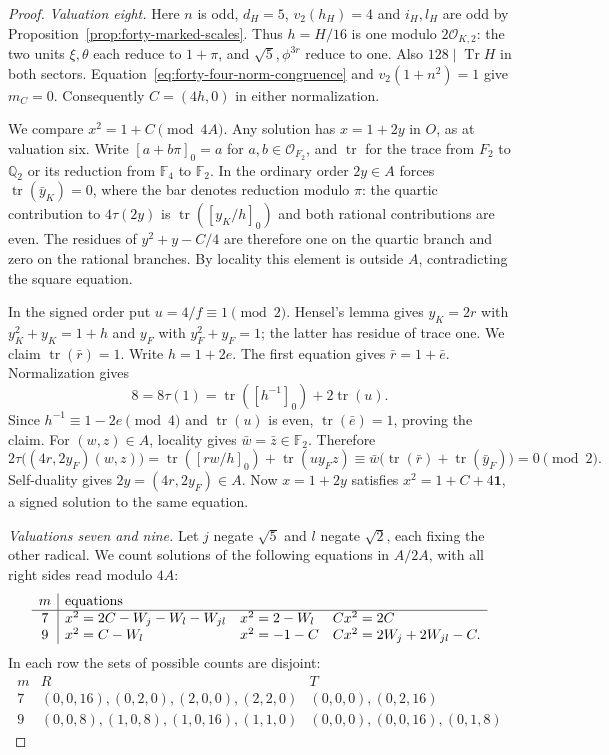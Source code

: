 \documentclass[11pt,reqno]{amsart}
\theoremstyle{remark}\newtheorem{remark}[theorem]{Remark}
\numberwithin{equation}{section}
\begin{document}
\begin{proof}
\smallskip\noindent\emph{Valuation eight.}
Here $n$ is odd, $d_H=5$, $v_2(h_H)=4$ and $i_H,l_H$ are odd
by Proposition~\ref{prop:forty-marked-scales}. Thus $h=H/16$ is
one modulo $2\mathcal O_{K,2}$: the two units $\xi,\theta$ each
reduce to $1+\pi$, and $\sqrt5,\phi^{3r}$ reduce to one. Also
$128\mid\operatorname{Tr}H$ in both sectors. Equation~\eqref{eq:forty-four-norm-congruence}
and $v_2(1+n^2)=1$ give $m_C=0$. Consequently $C=(4h,0)$
in either normalization.

We compare $x^2=1+C\pmod{4A}$. Any solution has $x=1+2y$ in
$O$, as at valuation six. Write $[a+b\pi]_0=a$ for $a,b\in\mathcal O_{F_2}$,
and $\operatorname{tr}$ for the trace from $F_2$ to $\mathbb Q_2$
or its reduction from $\mathbb F_4$ to $\mathbb F_2$. In the ordinary
order $2y\in A$ forces $\operatorname{tr}(\bar y_K)=0$, where the bar
denotes reduction modulo $\pi$: the quartic contribution to $4\tau(2y)$
is $\operatorname{tr}([y_K/h]_0)$ and both rational contributions are even.
The residues of $y^2+y-C/4$ are therefore one on the quartic branch
and zero on the rational branches. By locality this element is outside
$A$, contradicting the square equation.

In the signed order put $u=4/f\equiv1\pmod2$. Hensel's lemma gives
$y_K=2r$ with $y_K^2+y_K=1+h$ and $y_F$ with $y_F^2+y_F=1$;
the latter has residue of trace one. We claim $\operatorname{tr}(\bar r)=1$.
Write $h=1+2e$. The first equation gives $\bar r=1+\bar e$.
Normalization gives
\[
 8=8\tau(1)=\operatorname{tr}([h^{-1}]_0)+2\operatorname{tr}(u).
\]
Since $h^{-1}\equiv1-2e\pmod4$ and $\operatorname{tr}(u)$ is even,
$\operatorname{tr}(\bar e)=1$, proving the claim. For $(w,z)\in A$,
locality gives $\bar w=\bar z\in\mathbb F_2$. Therefore
\[
 2\tau\big((4r,2y_F)(w,z)\big)
 =\operatorname{tr}([rw/h]_0)+\operatorname{tr}(u y_Fz)
 \equiv \bar w\big(\operatorname{tr}(\bar r)+\operatorname{tr}(\bar y_F)\big)=0\pmod2.
\]
Self-duality gives $2y=(4r,2y_F)\in A$. Now $x=1+2y$ satisfies
$x^2=1+C+4\mathbf1$, a signed solution to the same equation.

\smallskip\noindent\emph{Valuations seven and nine.}
Let $j$ negate $\sqrt5$ and $l$ negate $\sqrt2$, each fixing the other
radical. We count solutions of the following equations
in $A/2A$, with all right sides read modulo $4A$:
\[
\begin{array}{c|lll}
m&\multicolumn{3}{l}{\text{equations}}\\ \hline
7&x^2=2C-W_j-W_l-W_{jl}&x^2=2-W_l&Cx^2=2C\\
9&x^2=C-W_l&x^2=-1-C&Cx^2=2W_j+2W_{jl}-C .
\end{array}
\]
In each row the sets of possible counts are disjoint:
\[
\begin{array}{c|l|l}
m&R&T\\ \hline
7&(0,0,16),(0,2,0),(2,0,0),(2,2,0)&(0,0,0),(0,2,16)\\
9&(0,0,8),(1,0,8),(1,0,16),(1,1,0)&(0,0,0),(0,0,16),(0,1,8)
\end{array}
\]


\end{proof}
\end{document}
